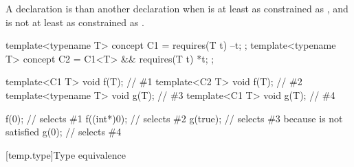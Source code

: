 \pnum
A declaration  is 
than another declaration  when  is at least as
constrained as , and  is not at least as
constrained as .
\begin{example}
\begin{codeblock}
template<typename T> concept C1 = requires(T t) { --t; };
template<typename T> concept C2 = C1<T> && requires(T t) { *t; };

template<C1 T> void f(T);       // \#1
template<C2 T> void f(T);       // \#2
template<typename T> void g(T); // \#3
template<C1 T> void g(T);       // \#4

f(0);                           // selects \#1
f((int*)0);                     // selects \#2
g(true);                        // selects \#3 because  is not satisfied
g(0);                           // selects \#4
\end{codeblock}
\end{example}

[temp.type]{Type equivalence}

